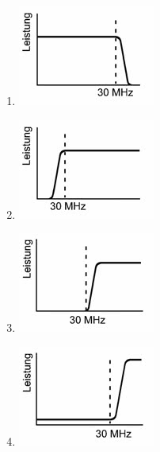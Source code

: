 \documentclass[8pt]{article}
\begin{document}
\begin{enumerate}[nolistsep,label=\Alph*]
\item
\begin{center}
	\begin{minipage}{\linewidth}
		\centering
		\includegraphics[scale=1.0]{pics/tk303_a.jpg}
	\end{minipage}
\end{center}
\item
\begin{center}
	\begin{minipage}{\linewidth}
		\centering
		\includegraphics[scale=1.0]{pics/tk303_b.jpg}
	\end{minipage}
\end{center}
\item
\begin{center}
	\begin{minipage}{\linewidth}
		\centering
		\includegraphics[scale=1.0]{pics/tk303_c.jpg}
	\end{minipage}
\end{center}
\item
\begin{center}
	\begin{minipage}{\linewidth}
		\centering
		\includegraphics[scale=1.0]{pics/tk303_d.jpg}
	\end{minipage}
\end{center}
\end{enumerate}
\end{document}
